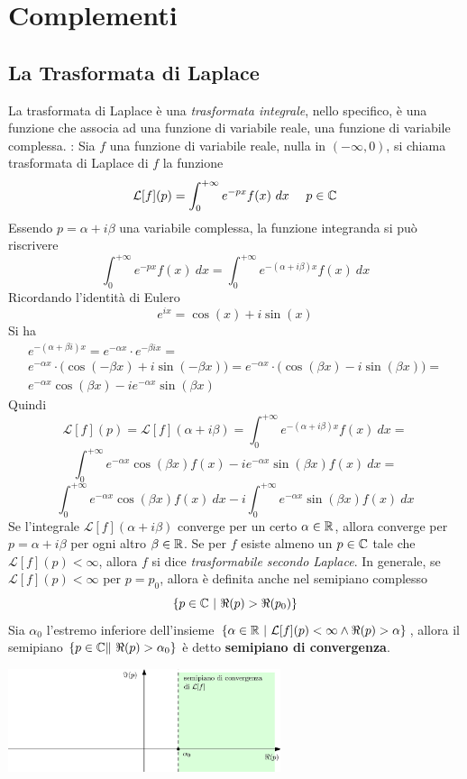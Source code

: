 \documentclass[10pt, letterpaper]{report}
\begin{document}
\chapter{Complementi}
\section{La Trasformata di Laplace} 
La trasformata di Laplace è una \textit{trasformata integrale}, nello specifico, è una 
funzione che associa ad una funzione di variabile reale, una funzione di variabile 
complessa.\acc 
{} : Sia $f$ una funzione di variabile reale, nulla 
in $(-\infty,0)$, si chiama trasformata di Laplace di $f$ la funzione 
$$ \mathcal{L}[f](p)=\int_0^{+\infty} e^{-px}f(x)\ dx \ \ \ \ p\in \C$$
Essendo $p = \alpha + i\beta$ una variabile complessa, la funzione integranda si può riscrivere 
$$\int_0^{+\infty} e^{-px}f(x)\ dx = 
\int_0^{+\infty} e^{-(\alpha + i\beta)x}f(x)\ dx$$
Ricordando l'identità di Eulero $$ e^{ix}=\cos(x)+i\sin(x)$$
Si ha 
\begin{eqnarray}
    e^{-(\alpha + \beta i)x} = e^{-\alpha x}\cdot e^{-\beta i x} =\\ 
    e^{-\alpha x}\cdot \Big(
    \cos(-\beta x)+ i \sin(-\beta x)    
    \Big) = e^{-\alpha x}\cdot \Big(
        \cos(\beta x)- i \sin(\beta x)    
        \Big) = \\ 
        e^{-\alpha x}\cos(\beta x)- i e^{-\alpha x}\sin(\beta x)
\end{eqnarray}
Quindi $$ \mathcal{L}[f](p)=\mathcal{L}[f](\alpha + i\beta)=
\int_0^{+\infty} e^{-(\alpha + i\beta)x}f(x)\ dx=
$$
$$
\int_0^{+\infty} e^{-\alpha x}\cos(\beta x)f(x)-ie^{-\alpha x}\sin(\beta x)f(x)\ dx =$$
$$ 
\int_0^{+\infty} e^{-\alpha x}\cos(\beta x)f(x)\ dx-i\int_0^{+\infty}e^{-\alpha x}\sin(\beta x)f(x)\ dx
$$
Se l'integrale $\mathcal{L}[f](\alpha + i\beta)$ converge per un certo
 $\alpha \in {\mathbb R}$, allora converge per $p = \alpha + i\beta$ per ogni altro $\beta \in {\mathbb R}$. Se per 
 $f$ esiste almeno un $p\in{\mathbb C}$ tale che $\mathcal{L}[f](p)<\infty$, allora $f$ si dice 
 \textit{trasformabile secondo Laplace}.\acc
 In generale, se $\mathcal{L}[f](p)<\infty$ per $p=p_0$, allora è definita anche nel semipiano 
 complesso $$\{p\in {\mathbb C} \ |\ \Re(p)>\Re(p_0)\}$$
 Sia $\alpha_0$ l'estremo inferiore dell'insieme $\{\alpha \in {\mathbb R} \ |\ \mathcal{L}[f](p)<\infty\land \Re(p)>\alpha\}$, allora 
 il semipiano $\{p\in \C \|\ \Re(p)>\alpha_0\}$ è detto \textbf{semipiano di convergenza}.
 \begin{center}
    \includegraphics[width=0.6\textwidth ]{images/semiPianoConv.eps}
 \end{center}
\end{document}
